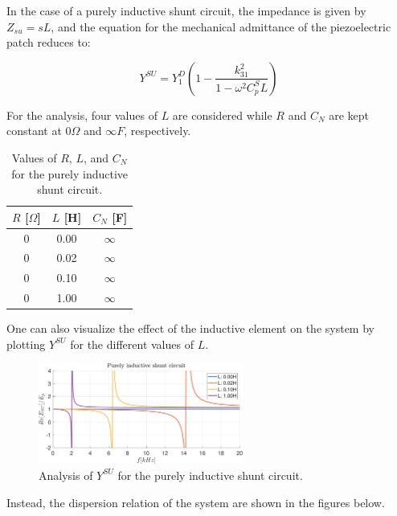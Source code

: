 In the case of a purely inductive shunt circuit, the impedance is given by $Z_{su} = sL$, and the equation for the mechanical admittance of the piezoelectric patch reduces to:

\begin{equation}
    Y^{SU} = Y_1^D \left( 1 - \frac{k_{31}^2}{1 -\omega^2 C_p^S L} \right)
    \label{eq:mechanical_admittance_R_shunt}
\end{equation}

For the analysis, four values of $L$ are considered while $R$ and $C_N$ are kept constant at $0 \Omega$ and $\infty F$, respectively.

\begin{table}[H]
    \centering
    \begin{tabular}{|c|c|c|}
        \hline
        $R$ [$\Omega$] & $L$ [H] & $C_N$ [F] \\
        \hline
        0              & 0.00    & $\infty$  \\
        0              & 0.02    & $\infty$  \\
        0              & 0.10    & $\infty$  \\
        0              & 1.00    & $\infty$  \\
        \hline
    \end{tabular}
    \caption{Values of $R$, $L$, and $C_N$ for the purely inductive shunt circuit.}
    \label{tab:RLC_N_values_L_case}
\end{table}

One can also visualize the effect of the inductive element on the system by plotting $Y^{SU}$ for the different values of $L$.

\begin{figure}[H]
    \centering
    \includegraphics[width=0.6\textwidth]{./img/MATLAB/Y_SU_Purely inductive shunt circuit.pdf}
    \caption{Analysis of $Y^{SU}$ for the purely inductive shunt circuit.}
    \label{fig:Y_SU_Purely_inductive_shunt_circuit.pdf}
\end{figure}

Instead, the dispersion relation of the system are shown in the figures below.

